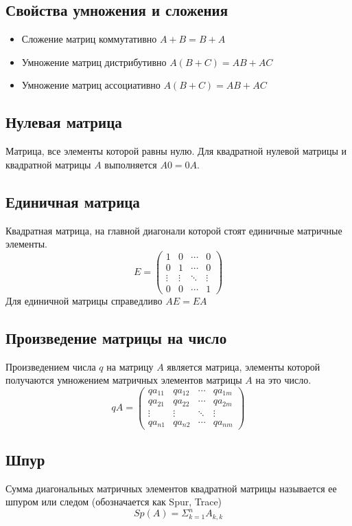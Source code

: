 \documentclass[a4paper,12pt]{article}
\begin{document}
\subsection{Свойства умножения и сложения}
\begin{itemize}
\item Сложение матриц коммутативно $A+B=B+A$
\item Умножение матриц дистрибутивно $A(B+C)=AB+AC$
\item Умножение матриц ассоциативно $A(B+C)=AB+AC$
\end{itemize}
\subsection{Нулевая матрица}
Матрица, все элементы которой равны нулю. Для квадратной нулевой матрицы и квадратной матрицы $A$ выполняется $A0=0A$.
\subsection{Единичная матрица}
Квадратная матрица, на главной диагонали которой стоят единичные матричные элементы.
\begin{equation}
E = \begin{pmatrix}
1 & 0 & \cdots & 0 \\
0 & 1 & \cdots & 0 \\         
\vdots & \vdots & \ddots & \vdots \\
0 & 0 & \cdots & 1
\end{pmatrix}
\end{equation}
Для единичной матрицы справедливо $AE=EA$
\subsection{Произведение матрицы на число}
Произведением числа $q$ на матрицу $A$ является матрица, элементы которой получаются умножением матричных элементов матрицы $A$ на это число.
\begin{equation}
q A = \begin{pmatrix}
q a_{11} & q a_{12} & \cdots & q a_{1m} \\
q a_{21} & q a_{22} & \cdots & q a_{2m} \\         
\vdots & \vdots & \ddots & \vdots \\
q a_{n1} & q a_{n2} & \cdots & q a_{nm}
\end{pmatrix}
\end{equation}
\subsection{Шпур}
Сумма диагональных матричных элементов квадратной матрицы называется ее шпуром или следом (обозначается как Spur, Trace)
\begin{equation}
	Sp(A)=\Sigma_{k=1}^{n} A_{k,k}
\end{equation}
\end{document}
